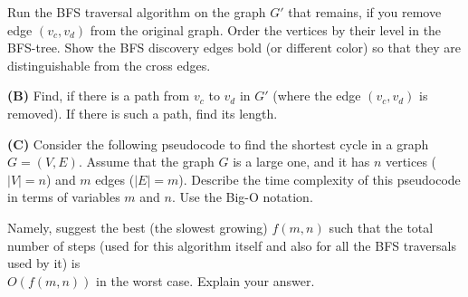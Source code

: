 \documentclass[a4paper,12pt]{article}
\begin{document}
Run the BFS traversal algorithm on the graph $G'$ that remains, 
if you remove edge $(v_c,v_d)$ from the original graph. 
Order the vertices by their level in the BFS-tree. 
Show the BFS discovery edges bold (or different color)
so that they are distinguishable from the cross edges.

\vspace{5pt}
{\bf (B)} Find, if there is a path from $v_c$ to $v_d$ in $G'$ (where the 
edge $(v_c,v_d)$ is removed). If there is such a path, find its length.




\vspace{5pt}
{\bf (C)} Consider the following pseudocode to find the shortest cycle in 
a graph $G=(V,E)$. 
Assume that the graph $G$ is a large one, and it has $n$ vertices ($|V| = n$)
and $m$ edges ($|E| = m$). 
Describe the time complexity of this pseudocode in terms of variables $m$ and $n$. 
Use the Big-O notation.

Namely, suggest the best (the slowest growing) $f(m,n)$ such that the
total number of steps (used for this algorithm itself and also for all the BFS traversals used by it) 
is\\ $O(f(m,n))$ in the worst case. 
Explain your answer. 
\end{document}
